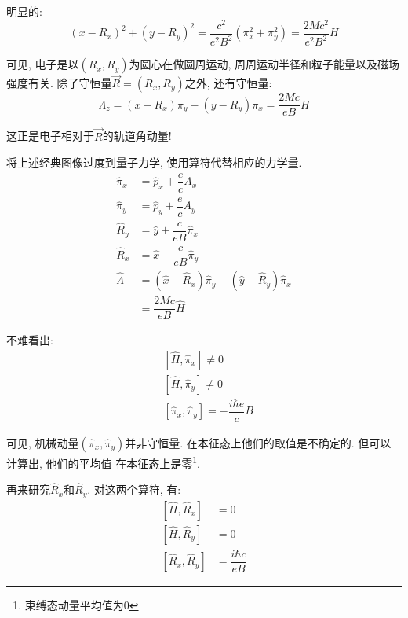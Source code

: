 \documentclass[a4paper, 11pt]{article}
\begin{document}
\begin{spacing}{1.2}
        明显的:
        \begin{equation}
          (x-R_x)^2+(y-R_y)^2 = \dfrac{c^2}{e^2B^2}\left(\pi_x^2+\pi_y^2\right) = \dfrac{2Mc^2}{e^2B^2}H
        \end{equation}

        可见, 电子是以$(R_x,R_y)$为圆心在做圆周运动, 周周运动半径和粒子能量以及磁场强度有关. 除了守恒量$\vec{R} = (R_x,R_y)$之外, 
        还有守恒量:
        \begin{equation}
          \Lambda_z = (x-R_x)\pi_y-(y-R_y)\pi_x = \dfrac{2Mc}{eB}H
        \end{equation}
        
        这正是电子相对于$\vec{R}$的轨道角动量!

        将上述经典图像过度到量子力学, 使用算符代替相应的力学量. 
        \begin{equation}
          \begin{aligned}
            \hat{\pi}_x &= \hat{p}_x + \dfrac{e}{c}A_x\\
            \hat{\pi}_y &= \hat{p}_y + \dfrac{e}{c}A_y\\
            \hat{R}_y  &= \hat{y}+\dfrac{c}{eB}\hat{\pi}_x\\
            \hat{R}_x &= \hat{x}-\dfrac{c}{eB}\hat{\pi}_y\\
            \hat{\Lambda} &= \left(\hat{x}-\hat{R}_x\right)\hat{\pi}_y-\left(\hat{y}-\hat{R}_y\right)\hat{\pi}_x \\
            &= \dfrac{2Mc}{eB}\hat{H}
          \end{aligned}
        \end{equation}

        不难看出:
        \begin{equation}
          \begin{aligned}
            &\left[\hat{H},\hat{\pi}_x\right] \ne 0\\
            &\left[\hat{H},\hat{\pi}_y\right] \ne 0\\
            &\left[\hat{\pi}_x,\hat{\pi}_y\right] = -\dfrac{i\hbar{}e}{c}B
          \end{aligned}
        \end{equation}

        可见, 机械动量$\left(\hat{\pi}_x,\hat{\pi}_y\right)$并非守恒量. 在本征态上他们的取值是不确定的. 但可以计算出, 他们的平均值
        在本征态上是零\footnote{束缚态动量平均值为0}.

        再来研究$\hat{R}_x$和$\hat{R}_y$. 对这两个算符, 有:
        \begin{equation}
          \begin{aligned}
          \left[\hat{H}, \hat{R}_x\right] &= 0\\
          \left[\hat{H}, \hat{R}_y\right] &= 0\\
          \left[\hat{R}_x,\hat{R}_y\right] &= \dfrac{i\hbar{}c}{eB}
          \end{aligned}
        \end{equation}


\end{spacing}
\end{document}
